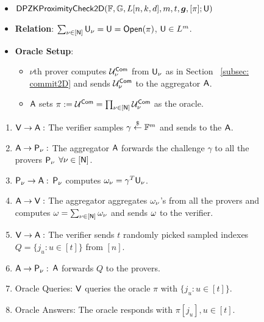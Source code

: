 \begin{figure}[h!]
	\centering
	\begin{framed}
		\begin{itemize}
			\item {$\mathsf{DPZK} \mathsf{ProximityCheck2D}(\mathbb{F}, \mathbb{G}, L[n,k,d], m, t, \bm{g}, [\pi]; \mathsf{U})$}
			\item {\bf Relation}: $\sum_{\nu \in [\mathsf{N}]} \mathsf{U}_{\nu} = \mathsf{U} = \mathsf{Open}(\pi)$, $\mathsf{U} \in L^m$.
			\item {\bf Oracle Setup}: 
			\begin{itemize}
				\item $\nu$th prover computes $\mathcal{U}^{\mathsf{Com}}_{\nu}$ from $\mathsf{U}_{\nu}$ as in Section ~\ref{subsec: commit2D} and sends $\mathcal{U}^{\mathsf{Com}}_{\nu}$ to the aggregator $\mathsf{A}$.
				\item $\mathsf{A}$ sets $\pi := \mathcal{U}^{\mathsf{Com}} = \prod_{\nu \in [\mathsf{N}]} \mathcal{U}^{\mathsf{Com}}_{\nu}$ as the oracle.
			\end{itemize}
		\end{itemize}
		\begin{enumerate}
			\item $\mathsf{V} \rightarrow \mathsf{A} : $ The verifier samples $\gamma \stackrel{\$} {\leftarrow} \mathbb{F}^m$ and sends to the $\mathsf{A}$.
		
			\item $\mathsf{A} \rightarrow \mathsf{P}_{\nu} : $ The aggregator $\mathsf{A}$ forwards the challenge $\gamma$ to all the provers $\mathsf{P}_{\nu}$ $\forall \nu\in [\mathsf{N}]$.
	
			\item $\mathsf{P}_{\nu} \rightarrow \mathsf{A} : $ $\mathsf{P}_{\nu}$ computes $\omega_{\nu} = \gamma^T\mathsf{U}_{\nu}$.
			
			\item $\mathsf{A} \rightarrow \mathsf{V} : $ The aggregator aggregates $\omega_{\nu}$'s from all the provers and computes $\omega=\sum_{\nu\in[\mathsf{N}]} \omega_{\nu}$ and sends $\omega$ to the verifier.
	
			\item $\mathsf{V} \rightarrow \mathsf{A} : $ The verifier sends $t$ randomly picked sampled indexes $Q= \{j_u:u\in[t]\}$ from $[n]$.
			
			\item $\mathsf{A} \rightarrow \mathsf{P}_{\nu} : $ $\mathsf{A}$ forwards $Q$ to the provers.
			\item Oracle Queries: $\mathsf{V}$ queries the oracle $\pi$ with $\{j_u:u\in[t]\}$.
			
			\item Oracle Answers: The oracle responds with $\pi[j_u], u\in[t]$.
			

\end{enumerate}
\end{framed}
\end{figure}
